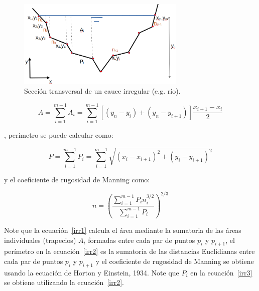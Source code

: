 \documentclass[11pt, oneside]{article}
\begin{document}
\begin{figure}[h!]
\centering
\includegraphics[width=8cm]{irre1.png}
\caption{Secci\'on transversal de un cauce irregular (e.g. r\'io).}
\label{irre1}
\end{figure}


\begin{equation}
A = \sum_{i=1}^{m-1} A_i = \sum_{i=1}^{m-1} \left[ (y_n - y_i )+(y_n - y_{i+1}) \right] \frac{x_{i+1}-x_i }{2}
\label{irr1}
\end{equation}

, perímetro se puede calcular como:

\begin{equation}
P = \sum_{i=1}^{m-1} P_i = \sum_{i=1}^{m-1} \sqrt{ (x_i - x_{i+1} )^2 + (y_i - y_{i+1})^2 }
\label{irr2}
\end{equation}

y el coeficiente de rugosidad de Manning como:

\begin{equation}
n = \left( \frac{\sum_{i=1}^{m-1} P_i n_i^{3/2}}{\sum_{i=1}^{m-1} P_i} \right)^{2/3}
\label{irr3}
\end{equation}

Note que la ecuaci\'on~\ref{irr1} calcula el \'area mediante la sumatoria de las áreas individuales (trapecios) $A_i$ formadas entre cada par de puntos $p_i$ y $p_{i+1}$, el perímetro en la ecuaci\'on~\ref{irr2} es la sumatoria de las distancias Euclidianas entre cada par de puntos $p_i$ y $p_{i+1}$ y el coeficiente de rugosidad de Manning  se obtiene usando la ecuación de Horton y Einstein, 1934. Note que $P_i$ en la ecuaci\'on~\ref{irr3} se obtiene utilizando la ecuaci\'on~\ref{irr2}.
\end{document}
